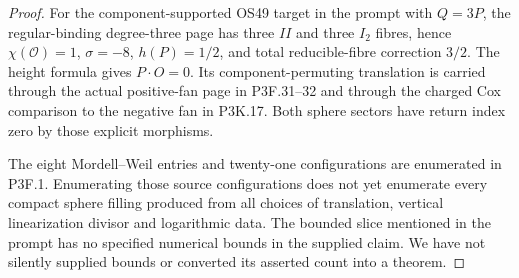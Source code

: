 \begin{proof}
For the component-supported OS49 target in the prompt with \(Q=3P\), the regular-binding degree-three page has three \(II\) and three \(I_2\) fibres, hence \(\chi(\mathcal O)=1\), \(\sigma=-8\), \(h(P)=1/2\), and total reducible-fibre correction \(3/2\). The height formula gives \(P\cdot O=0\). Its component-permuting translation is carried through the actual positive-fan page in P3F.31--32 and through the charged Cox comparison to the negative fan in P3K.17. Both sphere sectors have return index zero by those explicit morphisms.

The eight Mordell--Weil entries and twenty-one configurations are enumerated in P3F.1. Enumerating those source configurations does not yet enumerate every compact sphere filling produced from all choices of translation, vertical linearization divisor and logarithmic data. The bounded slice mentioned in the prompt has no specified numerical bounds in the supplied claim. We have not silently supplied bounds or converted its asserted count into a theorem.
\end{proof}
